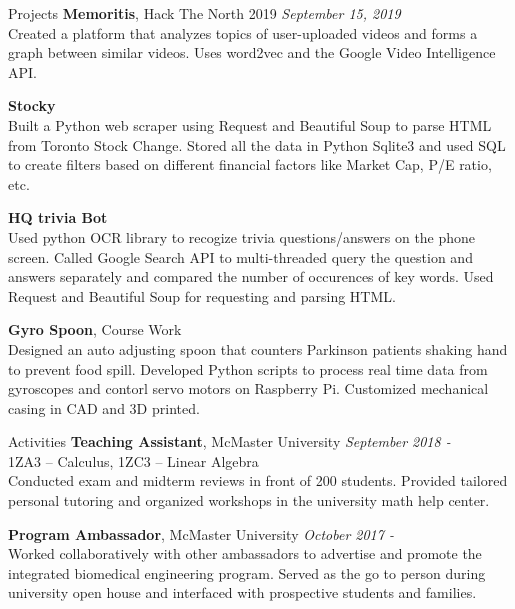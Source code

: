 \documentclass{resume} %
\begin{document}
\begin{rSection}{Projects}
{\bf Memoritis}{, Hack The North 2019} \hfill {\em September 15, 2019}\\
Created a platform that analyzes topics of user-uploaded videos and forms a graph between similar videos. Uses word2vec and the Google Video Intelligence API. 

{\bf Stocky} \\
Built a Python web scraper using Request and Beautiful Soup to parse HTML from Toronto Stock Change. Stored all the data in Python Sqlite3 and used SQL to create filters based on different financial factors like Market Cap, P/E ratio, etc.

{\bf HQ trivia Bot} \hfill \\
Used python OCR library to recogize trivia questions/answers on the phone screen. Called Google Search API to multi-threaded query the question and answers separately and compared the number of occurences of key words. Used Request and Beautiful Soup for requesting and parsing HTML.

{\bf Gyro Spoon}{, Course Work} \\
Designed an auto adjusting spoon that counters Parkinson patients shaking hand to prevent food spill. Developed Python scripts to process real time data from gyroscopes and contorl servo motors on Raspberry Pi. Customized mechanical casing in CAD and 3D printed. 



\end{rSection}
\begin{rSection}{Activities}
{\bf Teaching Assistant}{, McMaster University} \hfill {\em September 2018 - }\\
1ZA3 -- Calculus, 1ZC3 -- Linear Algebra\\
Conducted exam and midterm reviews in front of 200 students. Provided tailored personal tutoring and organized workshops in the university math help center. 

{\bf Program Ambassador}{,  McMaster University} \hfill {\em October 2017 - }\\
Worked collaboratively with other ambassadors to advertise and promote the integrated biomedical engineering program. Served as the go to person during university open house and interfaced with prospective students and families. \\


\end{rSection}
\end{document}
